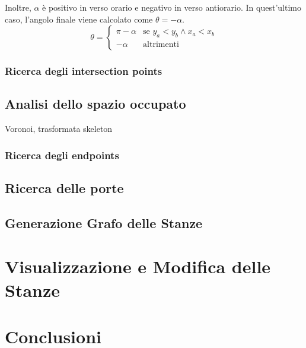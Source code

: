 \noindent
Inoltre, $\alpha$ è positivo in verso orario e negativo in verso antiorario. In quest'ultimo caso, l'angolo finale viene calcolato come $\theta = -\alpha$.
\begin{equation}
  \theta = \begin{cases}
    \pi - \alpha & \text{se } y_a < y_b \land x_a < x_b \\
    -\alpha      & \text{altrimenti}
  \end{cases}
\end{equation}
\subsubsection{Ricerca degli intersection points}

\subsection{Analisi dello spazio occupato}
Voronoi, trasformata skeleton
\subsubsection{Ricerca degli endpoints}

\subsection{Ricerca delle porte}

\subsection{Generazione Grafo delle Stanze}

\section{Visualizzazione e Modifica delle Stanze}

\section{Conclusioni}